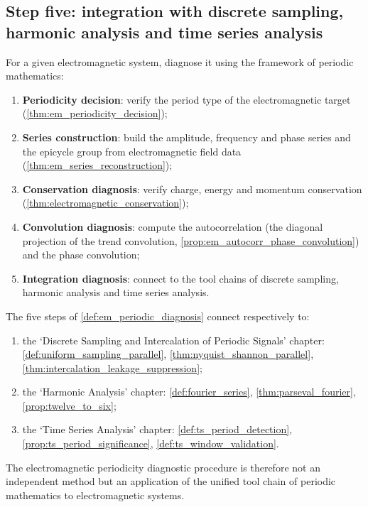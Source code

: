 \subsection{Step five: integration with discrete sampling, harmonic analysis and time series analysis}

\begin{definition}\label{def:em_periodic_diagnosis}
For a given electromagnetic system, diagnose it using the framework of periodic mathematics:
\begin{enumerate}[label=(\roman*)]
    \item \textbf{Periodicity decision}: verify the period type of the electromagnetic target (\cref{thm:em_periodicity_decision});
    \item \textbf{Series construction}: build the amplitude, frequency and phase series and the epicycle group from electromagnetic field data (\cref{thm:em_series_reconstruction});
    \item \textbf{Conservation diagnosis}: verify charge, energy and momentum conservation (\cref{thm:electromagnetic_conservation});
    \item \textbf{Convolution diagnosis}: compute the autocorrelation (the diagonal projection of the trend convolution, \cref{prop:em_autocorr_phase_convolution}) and the phase convolution;
    \item \textbf{Integration diagnosis}: connect to the tool chains of discrete sampling, harmonic analysis and time series analysis.
\end{enumerate}
\end{definition}

\begin{theorem}\label{thm:em_diagnosis_integration}
The five steps of \cref{def:em_periodic_diagnosis} connect respectively to:
\begin{enumerate}[label=(\roman*)]
    \item the `Discrete Sampling and Intercalation of Periodic Signals' chapter: \cref{def:uniform_sampling_parallel}, \cref{thm:nyquist_shannon_parallel}, \cref{thm:intercalation_leakage_suppression};
    \item the `Harmonic Analysis' chapter: \cref{def:fourier_series}, \cref{thm:parseval_fourier}, \cref{prop:twelve_to_six};
    \item the `Time Series Analysis' chapter: \cref{def:ts_period_detection}, \cref{prop:ts_period_significance}, \cref{def:ts_window_validation}.
\end{enumerate}
The electromagnetic periodicity diagnostic procedure is therefore not an independent method but an application of the unified tool chain of periodic mathematics to electromagnetic systems.
\end{theorem}

